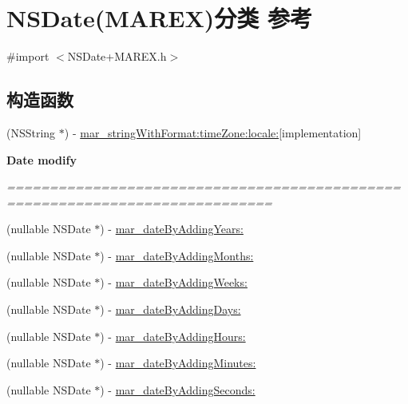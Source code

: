 \hypertarget{category_n_s_date_07_m_a_r_e_x_08}{}\section{N\+S\+Date(M\+A\+R\+EX)分类 参考}
\label{category_n_s_date_07_m_a_r_e_x_08}


{\ttfamily \#import $<$N\+S\+Date+\+M\+A\+R\+E\+X.\+h$>$}

\subsection*{构造函数}
\begin{DoxyCompactItemize}
\item 
(N\+S\+String $\ast$) -\/ \hyperlink{category_n_s_date_07_m_a_r_e_x_08_acf46ab1328948923919fdfcf4ad66bc8}{mar\+\_\+string\+With\+Format\+:time\+Zone\+:locale\+:}{\ttfamily  \mbox{[}implementation\mbox{]}}
\end{DoxyCompactItemize}
\begin{Indent}\textbf{ Date modify}\par
{\em ============================================================================= 

 }\begin{DoxyCompactItemize}
\item 
(nullable N\+S\+Date $\ast$) -\/ \hyperlink{category_n_s_date_07_m_a_r_e_x_08_a7d4254896b6694464753583d55b11d2e}{mar\+\_\+date\+By\+Adding\+Years\+:}
\item 
(nullable N\+S\+Date $\ast$) -\/ \hyperlink{category_n_s_date_07_m_a_r_e_x_08_a324d33275422b3b4d35bea5c5a4d7707}{mar\+\_\+date\+By\+Adding\+Months\+:}
\item 
(nullable N\+S\+Date $\ast$) -\/ \hyperlink{category_n_s_date_07_m_a_r_e_x_08_a52226cb41d05983b2f105af87b0d7e58}{mar\+\_\+date\+By\+Adding\+Weeks\+:}
\item 
(nullable N\+S\+Date $\ast$) -\/ \hyperlink{category_n_s_date_07_m_a_r_e_x_08_a071430ab41ab298a62052c2823668b6f}{mar\+\_\+date\+By\+Adding\+Days\+:}
\item 
(nullable N\+S\+Date $\ast$) -\/ \hyperlink{category_n_s_date_07_m_a_r_e_x_08_ab0c07450a4cfe456a24ff903273e85ee}{mar\+\_\+date\+By\+Adding\+Hours\+:}
\item 
(nullable N\+S\+Date $\ast$) -\/ \hyperlink{category_n_s_date_07_m_a_r_e_x_08_abdf3ea678b2e1861e429905afd45d365}{mar\+\_\+date\+By\+Adding\+Minutes\+:}
\item 
(nullable N\+S\+Date $\ast$) -\/ \hyperlink{category_n_s_date_07_m_a_r_e_x_08_a7ba0bc50c7f1d00911827d407dd0e53e}{mar\+\_\+date\+By\+Adding\+Seconds\+:}
\end{DoxyCompactItemize}
\end{Indent}
